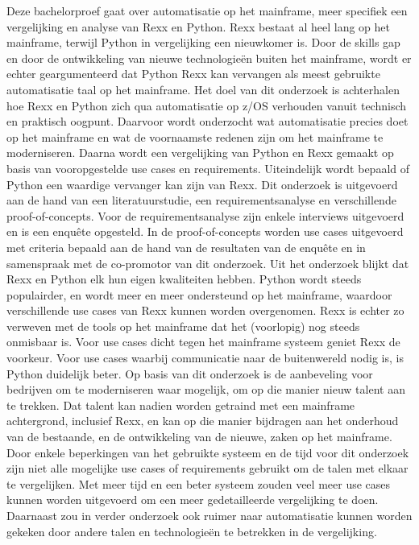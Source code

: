 Deze bachelorproef gaat over automatisatie op het mainframe, meer specifiek een vergelijking en analyse van Rexx en Python. Rexx bestaat al heel lang op het mainframe, terwijl Python in vergelijking een nieuwkomer is. Door de skills gap en door de ontwikkeling van nieuwe technologieën buiten het mainframe, wordt er echter geargumenteerd dat Python Rexx kan vervangen als meest gebruikte automatisatie taal op het mainframe.
Het doel van dit onderzoek is achterhalen hoe Rexx en Python zich qua automatisatie op z/OS verhouden vanuit technisch en praktisch oogpunt. Daarvoor wordt onderzocht wat automatisatie precies doet op het mainframe en wat de voornaamste redenen zijn om het mainframe te moderniseren. Daarna wordt een vergelijking van Python en Rexx gemaakt op basis van vooropgestelde use cases en requirements. Uiteindelijk wordt bepaald of Python een waardige vervanger kan zijn van Rexx.
Dit onderzoek is uitgevoerd aan de hand van een literatuurstudie, een requirementsanalyse en verschillende proof-of-concepts. Voor de requirementsanalyse zijn enkele interviews uitgevoerd en is een enquête opgesteld. In de proof-of-concepts worden use cases uitgevoerd met criteria bepaald aan de hand van de resultaten van de enquête en in samenspraak met de co-promotor van dit onderzoek.
Uit het onderzoek blijkt dat Rexx en Python elk hun eigen kwaliteiten hebben. Python wordt steeds populairder, en wordt meer en meer ondersteund op het mainframe, waardoor verschillende use cases van Rexx kunnen worden overgenomen. Rexx is echter zo verweven met de tools op het mainframe dat het (voorlopig) nog steeds onmisbaar is. Voor use cases dicht tegen het mainframe systeem geniet Rexx de voorkeur. Voor use cases waarbij communicatie naar de buitenwereld nodig is, is Python duidelijk beter. Op basis van dit onderzoek is de aanbeveling voor bedrijven om te moderniseren waar mogelijk, om op die manier nieuw talent aan te trekken. Dat talent kan nadien worden getraind met een mainframe achtergrond, inclusief Rexx, en kan op die manier bijdragen aan het onderhoud van de bestaande, en de ontwikkeling van de nieuwe, zaken op het mainframe.
Door enkele beperkingen van het gebruikte systeem en de tijd voor dit onderzoek zijn niet alle mogelijke use cases of requirements gebruikt om de talen met elkaar te vergelijken. Met meer tijd en een beter systeem zouden veel meer use cases kunnen worden uitgevoerd om een meer gedetailleerde vergelijking te doen. Daarnaast zou in verder onderzoek ook ruimer naar automatisatie kunnen worden gekeken door andere talen en technologieën te betrekken in de vergelijking. 

%
